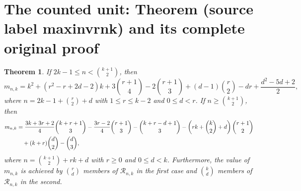 \documentclass[10pt,a4paper]{amsart}
\theoremstyle{plain}
\newtheorem{theorem}{Theorem}[section]
\begin{document}
\section{The counted unit: Theorem (source label maxinvrnk) and its complete original proof}

\begin{theorem}\label{maxinvrnk}
If $2k-1 \leq n <\binom{k+1}{2}$, then
\begin{equation}\label{maxinvrnke1}
m_{n,k}=k^2+(r^2-r+2d-2)k+3\binom{r+1}{4}-2\binom{r+1}{3}+(d-1)\binom{r}{2}-dr+\frac{d^2-5d+2}{2},
\end{equation}
where $n=2k-1+\binom{r}{2}+d$ with $1 \leq r \leq k-2$ and $0 \leq d <r$. If $n \geq \binom{k+1}{2}$, then
\begin{align}
m_{n,k}&=\frac{3k+3r+2}{4}\binom{k+r+1}{3}-\frac{3r-2}{4}\binom{r+1}{3}-\binom{k+r-d+1}{3}-\left(rk+\binom{k}{2}+d\right)\binom{r+1}{2}\notag\\
&\quad+(k+r)\binom{d}{2}-\binom{d}{3}, \label{maxinvrnke2}
\end{align}
where $n=\binom{k+1}{2}+rk+d$ with $r \geq 0$ and $0 \leq d <k$.  Furthermore, the value of $m_{n,k}$ is achieved by $\binom{r}{d}$ members of $\mathcal{R}_{n,k}$ in the first case and $\binom{k}{d}$ members of $\mathcal{R}_{n,k}$ in the second.
\end{theorem}
\end{document}

